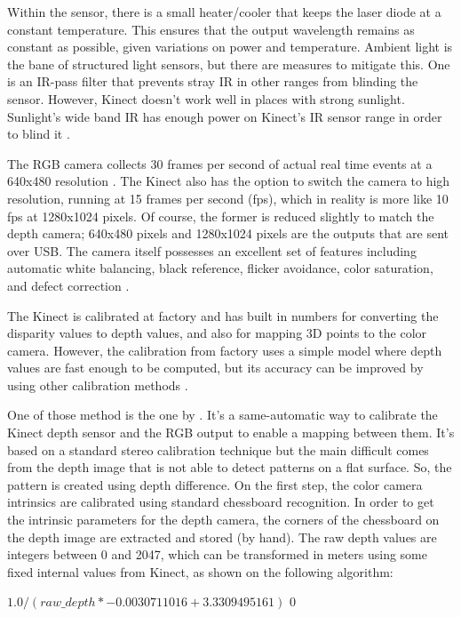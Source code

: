 \documentclass[msc, a4paper, classic, en]{ufbathesis}
\begin{document}
Within the sensor, there is a small heater/cooler that keeps the laser diode at a constant temperature. This ensures that the output wavelength remains as constant as possible, given variations on power and temperature. Ambient light is the bane of structured light sensors, but there are measures to mitigate this. One is an IR-pass filter that prevents stray IR in other ranges from blinding the sensor. However, Kinect doesn't work well in places with strong sunlight. Sunlight's wide band IR has enough power on Kinect's IR sensor range in order to blind it \cite{hackingkinect}.

The RGB camera collects 30 frames per second of actual real time events at a 640x480 resolution \cite{kinecthacks}. The Kinect also has the option to switch the camera to high resolution, running at 15 frames per second (fps), which in reality is more
like 10 fps at 1280x1024 pixels. Of course, the former is reduced slightly to match the depth camera;
640x480 pixels and 1280x1024 pixels are the outputs that are sent over USB. The camera itself possesses
an excellent set of features including automatic white balancing, black reference, flicker avoidance, color
saturation, and defect correction \cite{hackingkinect}.

The Kinect is calibrated at factory and has built in numbers for converting the disparity values to depth values, and also for mapping 3D points to the color camera. However, the calibration from factory uses a simple model where depth values are fast enough to be computed, but its accuracy can be improved by using other calibration methods \cite{magnus2013}.

One of those method is the one by \cite{burruscal}. It's a same-automatic way to calibrate the Kinect depth sensor and the RGB output to enable a mapping between them. It's based on a standard stereo calibration technique but the main difficult comes from the depth image that is not able to detect patterns on a flat surface. So, the pattern is created using depth difference. On the first step, the color camera intrinsics are calibrated using standard chessboard recognition. In order to get the intrinsic parameters for the depth camera, the corners of the chessboard on the depth image are extracted and stored (by hand). The raw depth values are integers between 0 and 2047, which can be transformed in meters using some fixed internal values from Kinect, as shown on the following algorithm:

\begin{algorithmic}
\Return $1.0 / (raw\_depth * -0.0030711016 + 3.3309495161)$
\Else \Return $0$
\EndIf
\EndFunction
\end{algorithmic}
\end{document}
